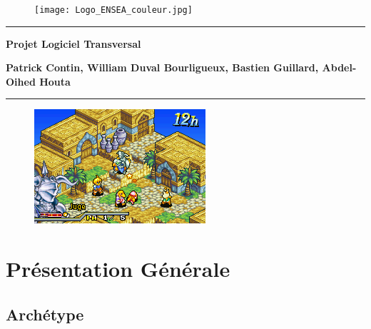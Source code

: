 \documentclass[a4paper,12pt]{article}
\newcommand{\HRule}{\rule{\linewidth}{0.5mm}}
\begin{document}
\thispagestyle{empty}

\begin{titlepage}

\begin{figure}[h]
\begin{center}
\texttt{[image: Logo\_ENSEA\_couleur.jpg]}
\end{center}
\end{figure}

\vspace*{2.5cm}
\HRule
\vspace{0.5cm}
\begin{center}\textbf{\Huge Projet Logiciel Transversal}\end{center}{\Large \par}

\begin{center}\textbf{\large Patrick Contin, William Duval Bourligueux, Bastien Guillard, Abdel-Oihed Houta}\end{center}{\large \par}

\HRule
\vspace{2cm}

\begin{figure}[h]
\begin{center}
\includegraphics[scale=1]{FFT.png}
\end{center}
\end{figure}


\clearpage

{\small
\tableofcontents
}

\end{titlepage}

\clearpage
\section{Présentation Générale}

\subsection{Archétype}
\end{document}
